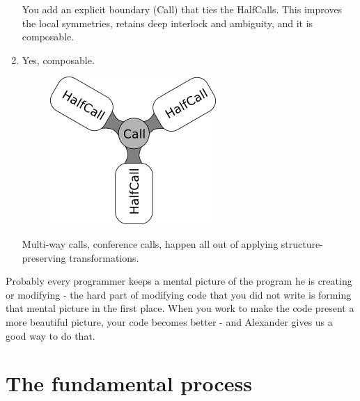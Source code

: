 \begin{enumerate}
\begin{figure}[h!]
   \end{figure}
 You add an explicit boundary (Call) that ties the HalfCalls. This improves the local symmetries, retains deep interlock and ambiguity, and it is composable.
 \item Yes, composable.
   \begin{figure}[h!]
     \centering
     \includegraphics[scale=0.6,keepaspectratio=true]{./usability/federico5.png}
   \end{figure}
 Multi-way calls, conference calls, happen all out of applying structure-preserving transformations.
\end{enumerate}
Probably every programmer keeps a mental picture of the program he is creating or modifying - the hard part of modifying code that you did not write is forming that mental picture in the first place. When you work to make the code present a more beautiful picture, your code becomes better - and Alexander gives us a good way to do that.

\section*{The fundamental process}

